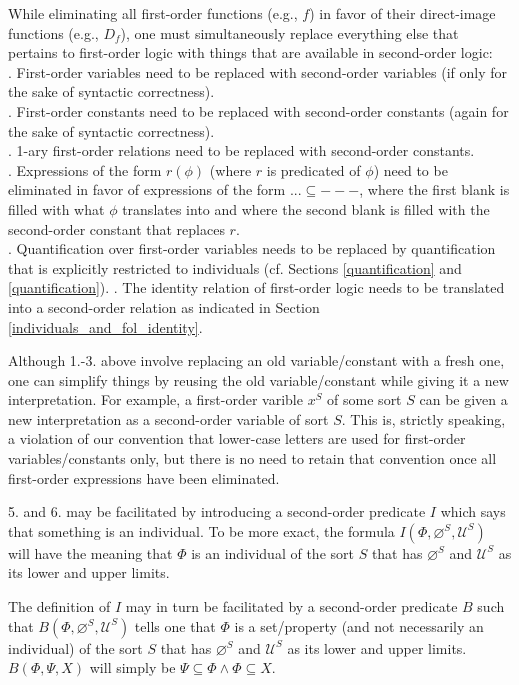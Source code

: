 \documentclass[12pt]{book}
\begin{document}
While eliminating all first-order functions (e.g., $f$) in favor of their direct-image functions (e.g., $D_f$), one must simultaneously replace everything else that pertains to first-order logic with things that are available in second-order logic:\\
. First-order variables need to be replaced with second-order variables (if only for the sake of syntactic correctness).\\
. First-order constants need to be replaced with second-order constants (again for the sake of syntactic correctness).\\
. 1-ary first-order relations need to be replaced with second-order constants.\\
. Expressions of the form $r(\phi)$ (where $r$ is predicated of $\phi$) need to be eliminated in favor of expressions of the form $... \subseteq ---$, where the first blank is filled with what $\phi$ translates into and where the second blank is filled with the second-order constant that replaces $r$.\\
. Quantification over first-order variables needs to be replaced by quantification that is explicitly restricted to individuals (cf. Sections \ref{quantification} and \ref{quantification}).
. The identity relation of first-order logic needs to be translated into a second-order relation as indicated in Section \ref{individuals_and_fol_identity}.

Although 1.-3. above involve replacing an old variable/constant with a fresh one, one can simplify things by reusing the old variable/constant while giving it a new interpretation. For example, a first-order varible $x^S$ of some sort $S$ can be given a new interpretation as a second-order variable of sort $S$. This is, strictly speaking, a violation of our convention that lower-case letters are used for first-order variables/constants only, but there is no need to retain that convention once all first-order expressions have been eliminated.

5. and 6. may be facilitated by introducing a second-order predicate $I$ which says that something is an individual. To be more exact, the formula $I(\Phi, \varnothing^S, \mathcal{U}^S)$ will have the meaning that $\Phi$ is an individual of the sort $S$ that has $\varnothing^S$ and $\mathcal{U}^S$ as its lower and upper limits. 

The definition of $I$ may in turn be facilitated by a second-order predicate $B$ such that $B(\Phi, \varnothing^S, \mathcal{U}^S)$ tells one that $\Phi$ is a set/property (and not necessarily an individual) of the sort $S$ that has $\varnothing^S$ and $\mathcal{U}^S$ as its lower and upper limits. $B(\Phi, \Psi, X)$ will simply be $\Psi \subseteq \Phi \wedge \Phi \subseteq X$.
\end{document}
